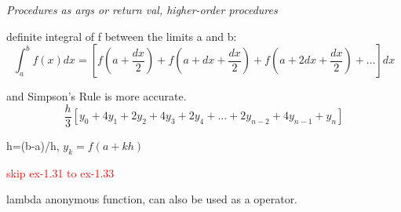 \emph{Procedures as args or return val, higher-order procedures}

definite integral of f between the limits a and b:
\begin{equation}
\int_a^b f(x)dx=[f(a+\frac{dx}{2})+f(a+dx+\frac{dx}{2})+f(a+2dx+\frac{dx}{2})+\dots]dx
\end{equation}

and Simpson's Rule is more accurate.
\begin{equation}
\frac{h}{3}[y_0+4y_1+2y_2+4y_3+2y_4+\dots+2y_{n-2}+4y_{n-1}+y_{n}]
\end{equation}

h=(b-a)/h, $y_k=f(a+kh)$

\textcolor{red}{skip ex-1.31 to ex-1.33}

lambda anonymous function, can also be used as a operator.






